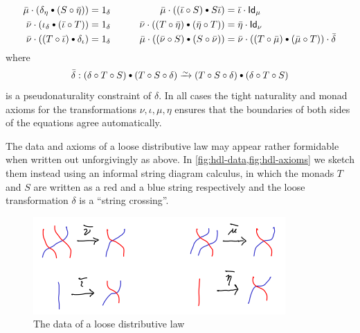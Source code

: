 \documentclass{amsart}
\let\tc\cdot
\newcommand{\bc}{\mathbin{\raisebox{1pt}{\scriptsize$\bullet$}}}
\let\oc\circ
\newcommand{\hunit}[1]{\Id_{#1}}
\newcommand{\Tmult}{\nu}
\newcommand{\Tunit}{\iota}
\newcommand{\Smult}{\mu}
\newcommand{\Sunit}{\eta}
\newcommand{\dl}{\delta}
\newcommand{\dlnat}{\bar\delta}
\newcommand{\Tdlmult}{\bar\Tmult}%
\newcommand{\Sdlmult}{\bar\Smult}%
\newcommand{\Tdlunit}{\bar\Tunit}%
\newcommand{\Sdlunit}{\bar\Sunit}%
\newcommand{\Id}{\mathsf{Id}}
\begin{document}
\begin{defn}
\begin{enumerate}
\begin{alignat*}{2}
        \Sdlmult \tc (\dl_{\Sunit} \bc (S\oc \Sdlunit)) &= 1_\dl &\qquad %
        \Sdlmult \tc ((\Tdlunit\oc S)\bc S\Tdlunit) &= \Tdlunit \tc \hunit{\Smult} \\ %
        \Tdlmult \tc (\Tunit_\dl \bc (\Tdlunit\oc T)) &= 1_\dl &\qquad    %
        \Tdlmult \tc ((T\oc\Sdlunit)\bc (\Sdlunit\oc T)) &= \Sdlunit \tc \hunit{\Tmult} \\ %
        \Tdlmult \tc ((T\oc\Tdlunit) \bc \dl_{\Tunit}) &= 1_\dl &\qquad  %
        \Sdlmult \tc ((\Tdlmult \oc S)\bc (S\oc \Tdlmult)) &= \Tdlmult \tc ((T\oc\Sdlmult)\bc (\Sdlmult\oc T)) \tc \dlnat %
      \end{alignat*}
      where
      \[\dlnat : (\dl\oc T\oc S) \bc (T\oc S\oc \dl) \toiso (T\oc S\oc \dl) \bc (\dl\oc T\oc S)\]
      is a pseudonaturality constraint of $\dl$.
      In all cases the tight naturality and monad axioms for the transformations $\Tmult,\Tunit,\Smult,\Sunit$ ensures that the boundaries of both sides of the equations agree automatically.
  \end{enumerate}
\end{defn}

The data and axioms of a loose distributive law may appear rather formidable when written out unforgivingly as above.
In \cref{fig:hdl-data,fig:hdl-axioms} we sketch them instead using an informal string diagram calculus, in which the monads $T$ and $S$ are written as a red and a blue string respectively and the loose transformation $\dl$ is a ``string crossing''.

\begin{figure}
  \centering
  \includegraphics{hdl-data.png}
  \caption{The data of a loose distributive law}
  \label{fig:hdl-data}
\end{figure}
\end{document}
